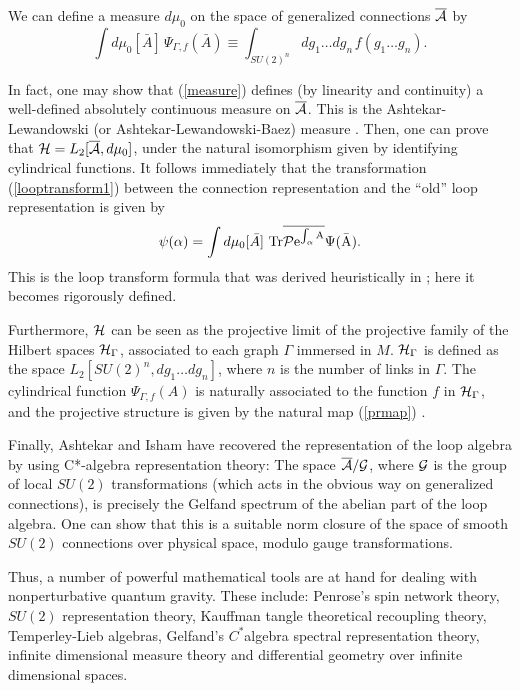 \documentclass[12pt]{article}
\begin{document}
We can define a measure $d\mu_{0}$ on the space of generalized 
connections $\overline{\cal A}$ by
\begin{equation}
	\int d\mu_{0}[\bar A]\, \Psi_{\Gamma,f}(\bar A)
	\equiv \int_{SU(2)^{n}} \!\!\!\! 
	dg_{1}\ldots dg_{n\,} f(g_{1}\ldots g_{n}).
	\label{measure}
\end{equation}

In fact, one may show that (\ref{measure}) defines (by linearity 
and continuity) a well-defined absolutely continuous measure on 
$\overline{\cal A}$.  This is the Ashtekar-Lewandowski (or 
Ashtekar-Lewandowski-Baez) measure 
\cite{AshtekarLewandowski,AshtekarLewandowski3,%
AshtekarLewandowski2,Baez}.  Then, one can prove that ${\cal H} = 
L_{2}[\overline{\cal A},d\mu_0]$, under the natural isomorphism 
given by identifying cylindrical functions.  It follows 
immediately that the transformation (\ref{looptransform1}) between 
the connection representation and the ``old'' loop representation 
is given by
\begin{equation}
	\psi(\alpha)=\int d\mu_{0}[\bar A] \ 
	\rm{Tr} \overline{{\cal P} e^{\int_{\alpha}A}}	\Psi(\bar A).
	\label{looptransform}
\end{equation}
This is the loop transform formula that was derived heuristically 
in \cite{RovelliSmolin90}; here it becomes rigorously defined. 

Furthermore, $\cal H$ can be seen as the projective limit of the 
projective family of the Hilbert spaces ${\cal H}_{\Gamma}$, 
associated to each graph $\Gamma$ immersed in $M$.  ${\cal 
H}_{\Gamma}$ is defined as the space $L_{2}[SU(2)^{n}, dg_{1} 
\ldots dg_{n}]$, where $n$ is the number of links in $\Gamma$. 
The cylindrical function $\Psi_{\Gamma,f}(A)$ is naturally 
associated to the function $f$ in ${\cal H}_{\Gamma}$, and the
projective structure is given by the natural map (\ref{prmap})  
\cite{AshtekarEtAl95,MarolfMourao}. 

Finally, Ashtekar and Isham \cite{AshtekarIsham} have recovered 
the representation of the loop algebra by using C*-algebra 
representation theory: The space $\overline{\cal A}/{\cal G}$, 
where $\cal G$ is the group of local $SU(2)$ transformations 
(which acts in the obvious way on generalized connections), is 
precisely the Gelfand spectrum of the abelian part of the loop 
algebra.  One can show that this is a suitable norm closure of 
the space of smooth $SU(2)$ connections over physical space, 
modulo gauge transformations.

Thus, a number of powerful mathematical tools are at hand for 
dealing with nonperturbative quantum gravity.   These 
include: Penrose's spin network theory, $SU(2)$ 
representation theory, Kauffman tangle theoretical recoupling 
theory, Temperley-Lieb algebras, Gelfand's $C^*$algebra 
spectral representation theory, infinite dimensional measure 
theory and differential geometry over infinite dimensional 
spaces.
\end{document}
